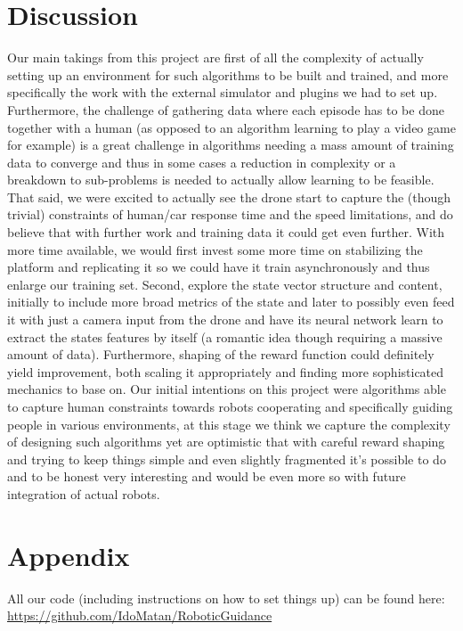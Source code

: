 \documentclass[a4paper,11pt]{article}
\begin{document}
\section{Discussion}
Our main takings from this project are first of all the complexity of actually setting up an environment for such algorithms to be built and trained, and more specifically the work with the external simulator and plugins we had to set up. Furthermore, the challenge of gathering data where each episode has to be done together with a human (as opposed to an algorithm learning to play a video game for example) is a great challenge in algorithms needing a mass amount of training data to converge and thus in some cases a reduction in complexity or a breakdown to sub-problems is needed to actually allow learning to be feasible. That said, we were excited to actually see the drone start to capture the (though trivial) constraints of human/car response time and the speed limitations, and do believe that with further work and training data it could get even further.
With more time available, we would first invest some more time on stabilizing the platform and replicating it so we could have it train asynchronously and thus enlarge our training set. Second, explore the state vector structure and content, initially to include more broad metrics of the state and later to possibly even feed it with just a camera input from the drone and have its neural network learn to extract the states features by itself (a romantic idea though requiring a massive amount of data). Furthermore, shaping of the reward function could definitely yield improvement, both scaling it appropriately and finding more sophisticated mechanics to base on.
Our initial intentions on this project were algorithms able to capture human constraints towards robots cooperating and specifically guiding people in various environments, at this stage we think we capture the complexity of designing such algorithms yet are optimistic that with careful reward shaping and trying to keep things simple and even slightly fragmented it's possible to do and to be honest very interesting and would be even more so with future integration of actual robots.


\section{Appendix} All our code (including instructions on how to set things up) can be found here:\\ \hyperlink{https://github.com/IdoMatan/RoboticGuidance}{https://github.com/IdoMatan/RoboticGuidance}











\end{document}
